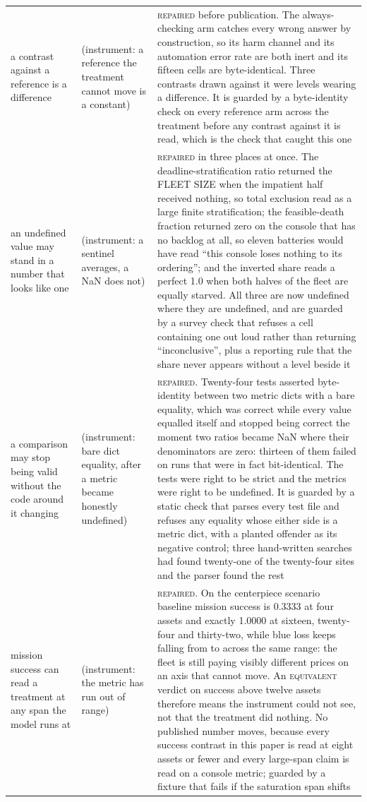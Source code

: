 \begin{tabular}{@{}p{}p{}p{}@{}}
a contrast against a reference is a difference & (instrument: a reference the treatment cannot move is a constant) & \textsc{repaired} before publication. The always-checking arm catches every wrong answer by construction, so its harm channel and its automation error rate are both inert and its fifteen cells are byte-identical. Three contrasts drawn against it were levels wearing a difference. It is guarded by a byte-identity check on every reference arm across the treatment before any contrast against it is read, which is the check that caught this one \\
an undefined value may stand in a number that looks like one & (instrument: a sentinel averages, a NaN does not) & \textsc{repaired} in three places at once. The deadline-stratification ratio returned the FLEET SIZE when the impatient half received nothing, so total exclusion read as a large finite stratification; the feasible-death fraction returned zero on the console that has no backlog at all, so eleven batteries would have read ``this console loses nothing to its ordering''; and the inverted share reads a perfect 1.0 when both halves of the fleet are equally starved. All three are now undefined where they are undefined, and are guarded by a survey check that refuses a cell containing one out loud rather than returning ``inconclusive'', plus a reporting rule that the share never appears without a level beside it \\
a comparison may stop being valid without the code around it changing & (instrument: bare dict equality, after a metric became honestly undefined) & \textsc{repaired}. Twenty-four tests asserted byte-identity between two metric dicts with a bare equality, which was correct while every value equalled itself and stopped being correct the moment two ratios became NaN where their denominators are zero: thirteen of them failed on runs that were in fact bit-identical. The tests were right to be strict and the metrics were right to be undefined. It is guarded by a static check that parses every test file and refuses any equality whose either side is a metric dict, with a planted offender as its negative control; three hand-written searches had found twenty-one of the twenty-four sites and the parser found the rest \\
mission success can read a treatment at any span the model runs at & (instrument: the metric has run out of range) & \textsc{repaired}. On the centerpiece scenario baseline mission success is 0.3333 at four assets and exactly 1.0000 at sixteen, twenty-four and thirty-two, while blue loss keeps falling from \CeLossSixteen{} to \CeLossThirtyTwo{} across the same range: the fleet is still paying visibly different prices on an axis that cannot move. An \textsc{equivalent} verdict on success above twelve assets therefore means the instrument could not see, not that the treatment did nothing. No published number moves, because every success contrast in this paper is read at eight assets or fewer and every large-span claim is read on a console metric; guarded by a fixture that fails if the saturation span shifts \\

\end{tabular}
